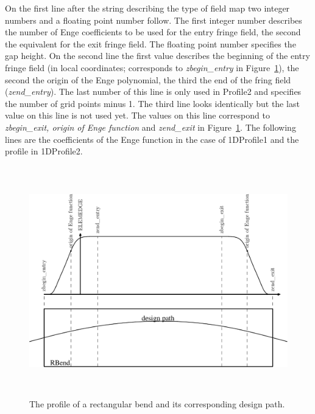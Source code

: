 On the first line after the string describing the type of field map two integer numbers and a floating point number follow. The first integer number describes the number of Enge coefficients to be used for the entry fringe field, the second the equivalent for the exit fringe field. The floating point number specifies the gap height. On the second line the first value describes the beginning of the entry fringe field (in local coordinates; corresponds to {\sl zbegin\_entry} in Figure~\ref{fig:fringefields}), the second the origin of the Enge polynomial, the third the end of the fring field ({\sl zend\_entry}). The last number of this line is only used in Profile2 and specifies the number of grid points minus 1. The third line looks identically but the last value on this line is not used yet. The values on this line correspond to {\sl zbegin\_exit, origin of Enge function} and {\sl zend\_exit} in Figure~\ref{fig:fringefields}. The following lines are the coefficients of the Enge function in the case of 1DProfile1 and the profile in 1DProfile2.

\begin{figure}[ht]
  \begin{center}
    \includegraphics[origin=bl,height=100mm,angle=0]{./figures/Fieldmaps/profile-1.pdf}
    \caption{The profile of a rectangular bend and its corresponding design path.}
    \label{fig:fringefields}
  \end{center}
\end{figure}

